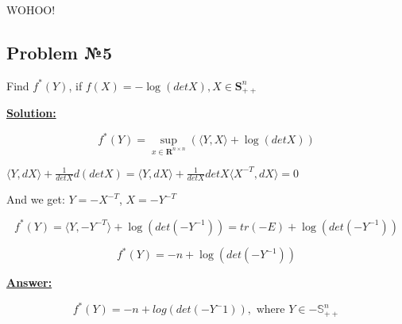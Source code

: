 WOHOO!

\subsection{Problem №5}
Find $f^*(Y)$, if $f(X) = -\log( det X), X \in \mathbf{S}_{++}^n$

\underline{\textbf{Solution:}}

\begin{equation*}
    f^*(Y) = \sup_{x \in \mathbf{R}^{n \times n}} \left( \langle Y, X \rangle + \log(detX) \right)
\end{equation*}

$\langle Y, dX \rangle + \frac{1}{detX}d(detX) = \langle Y, dX \rangle + \frac{1}{detX}detX \langle X^{-T}, dX \rangle = 0$

And we get: $Y = - X^{-T}$, $X = -Y^{-T}$

\begin{equation*}
    f^*(Y) = \langle Y, - Y^{-T} \rangle + \log(det(-Y^{-1})) = tr(-E) + \log \left(det(-Y^{-1}) \right)
\end{equation*}

\begin{equation*}
    f^*(Y) = -n + \log \left(det(-Y^{-1}) \right)
\end{equation*}

\underline{\textbf{Answer:}}

\begin{equation*}
    f^*(Y) = -n + log(det(-Y^-1)), \text{ where } Y \in -\mathds{S}_{++}^n
\end{equation*}